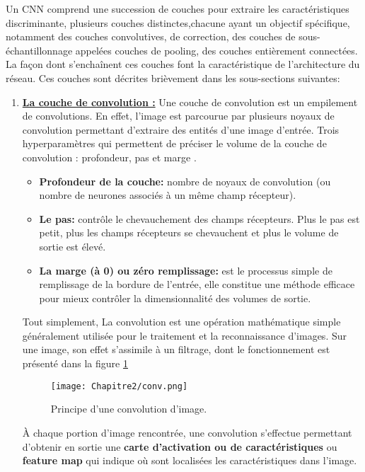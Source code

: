  Un CNN comprend une succession de couches pour extraire les caractéristiques discriminante, plusieurs couches distinctes,chacune ayant un objectif spécifique, notamment  des couches convolutives, de correction,  des couches de sous-échantillonnage appelées couches de pooling, des couches entièrement connectées. La façon dont s'enchaînent ces couches font la caractéristique de l'architecture du réseau. Ces couches sont décrites brièvement dans les sous-sections suivantes:

\begin{enumerate}
\item \underline{\textbf{La couche de convolution :}}
Une couche de convolution est un empilement de convolutions. En effet, l'image est parcourue par plusieurs noyaux de convolution permettant d'extraire des entités d'une image d'entrée. Trois hyperparamètres qui permettent de préciser le volume de la couche de convolution :  profondeur, pas et  marge \cite{CNN2015}.  

\begin{itemize}
\item \textbf{Profondeur de la couche:} nombre de noyaux de convolution (ou nombre de neurones associés à un même champ récepteur).

 \item \textbf{Le pas:} contrôle le chevauchement des champs récepteurs. Plus le pas est petit, plus les champs récepteurs se chevauchent et plus le volume de sortie est élevé.
  
 \item  \textbf{La marge (à 0) ou zéro remplissage:} est le processus simple de remplissage de la bordure de l'entrée, elle constitue une méthode efficace pour mieux contrôler la dimensionnalité des volumes de sortie.

\end{itemize}
Tout simplement, La convolution est une opération mathématique simple généralement utilisée pour le traitement et la reconnaissance d'images. Sur une image, son effet s'assimile à un filtrage,  dont le fonctionnement est présenté dans la figure \ref{conv}

\begin{figure}[H]
\centering
\texttt{[image: Chapitre2/conv.png]}
\caption{Principe d'une convolution d'image.}
\label{conv}
\end{figure}

À chaque portion d'image rencontrée, une convolution s'effectue permettant d'obtenir en sortie une \textbf{carte d'activation ou de caractéristiques} ou \textbf{feature map} qui indique où sont localisées les caractéristiques dans l'image. \\


\end{enumerate}

